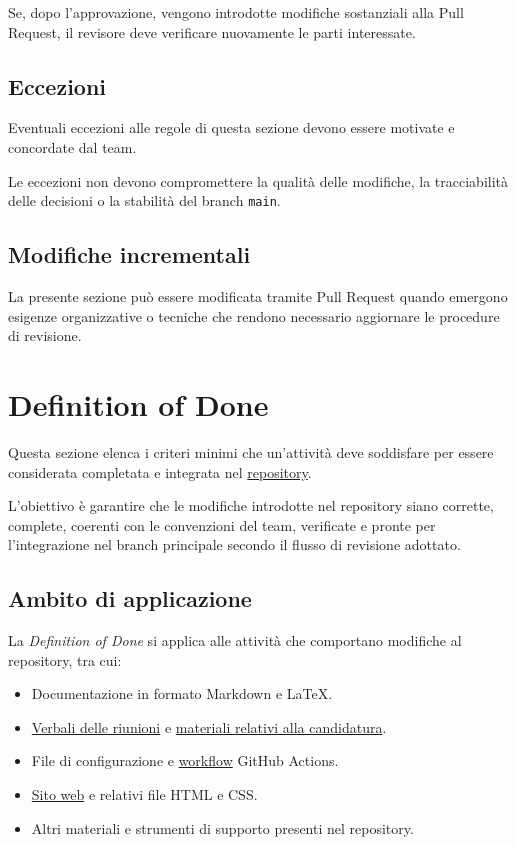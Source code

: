 \documentclass[11pt, a4paper]{article}
\begin{document}
Se, dopo l'approvazione, vengono introdotte modifiche sostanziali alla Pull Request, il revisore deve verificare nuovamente le parti interessate.

\subsection{Eccezioni}

Eventuali eccezioni alle regole di questa sezione devono essere motivate e concordate dal team.

Le eccezioni non devono compromettere la qualità delle modifiche, la tracciabilità delle decisioni o la stabilità del branch \texttt{main}.

\subsection{Modifiche incrementali}

La presente sezione può essere modificata tramite Pull Request quando emergono esigenze organizzative o tecniche che rendono necessario aggiornare le procedure di revisione.

\section{Definition of Done}

Questa sezione elenca i criteri minimi che un'attività deve soddisfare per essere considerata completata e integrata nel \href{https://github.com/On-By-One-Team/On-By-One.github.io}{repository}.

L'obiettivo è garantire che le modifiche introdotte nel repository siano corrette, complete, coerenti con le convenzioni del team, verificate e pronte per l'integrazione nel branch principale secondo il flusso di revisione adottato.

\subsection{Ambito di applicazione}

La \textit{Definition of Done} si applica alle attività che comportano modifiche al repository, tra cui:
\begin{itemize}
    \item Documentazione in formato Markdown e LaTeX.
    \item \href{https://github.com/On-By-One-Team/On-By-One.github.io/tree/main/docs/pdf/verbali}{Verbali delle riunioni} e \href{https://github.com/On-By-One-Team/On-By-One.github.io/tree/main/docs/pdf/candidatura}{materiali relativi alla candidatura}.
    \item File di configurazione e \href{https://github.com/On-By-One-Team/On-By-One.github.io/tree/main/.github/workflows}{workflow} GitHub Actions.
    \item \href{https://on-by-one-team.github.io/On-By-One.github.io/}{Sito web} e relativi file HTML e CSS.
    \item Altri materiali e strumenti di supporto presenti nel repository.
\end{itemize}
\end{document}
